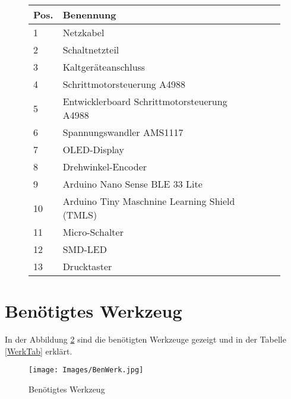 \begin{figure}[H]
	\begin{center}
		\fontsize{8}{10}\selectfont
		\begin{tabularx}{\textwidth}{|p{0.4cm}|X|X|X|X|X|} 
			\hline 
			\textbf{Pos.} &  \textbf{Benennung} \\ \hline
			1 & Netzkabel   \\ \hline
			2 & Schaltnetzteil   \\ \hline
			3 & Kaltgeräteanschluss   \\ \hline
			4 & Schrittmotorsteuerung A4988   \\ \hline
			5 & Entwicklerboard Schrittmotorsteuerung A4988   \\ \hline
			6 & Spannungswandler AMS1117 \\ \hline
			7 & OLED-Display  \\ \hline
			8 & Drehwinkel-Encoder  \\ \hline
			9 & Arduino Nano Sense BLE 33 Lite  \\ \hline
			10 & Arduino Tiny Maschnine Learning Shield (TMLS) \\ \hline
			11 & Micro-Schalter  \\ \hline
			12 & SMD-LED \\ \hline
			13 & Drucktaster  \\ \hline
					
		\end{tabularx}
			\label{ElekTab}
	\end{center}
\end{figure}

\section{Benötigtes Werkzeug}

In der Abbildung \ref{Benwerk} sind die benötigten Werkzeuge gezeigt und in der Tabelle \ref{WerkTab} erklärt. 

\begin{figure}[H]
	\begin{center}
		\texttt{[image: Images/BenWerk.jpg]}
		\caption{Benötigtes Werkzeug} \label{Benwerk}
	\end{center}
\end{figure}

